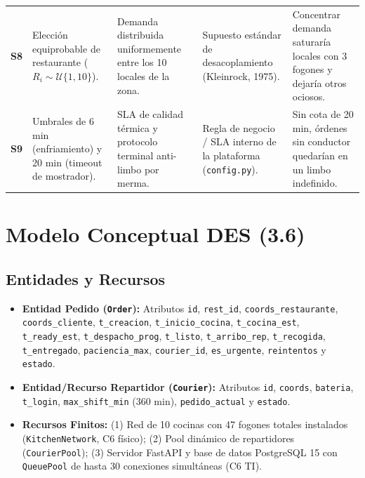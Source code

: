 \documentclass[11pt,letterpaper]{article}
\begin{document}
\begin{table}[htbp]
\begin{tabularx}{\textwidth}{c p{3.8cm} p{3.5cm} p{3.5cm} X}
\addlinespace
\textbf{S8} & Elección equiprobable de restaurante ($R_i \sim \mathcal{U}\{1, 10\}$). & Demanda distribuida uniformemente entre los 10 locales de la zona. & Supuesto estándar de desacoplamiento (Kleinrock, 1975). & Concentrar demanda saturaría locales con 3 fogones y dejaría otros ociosos. \\
\addlinespace
\textbf{S9} & Umbrales de 6 min (enfriamiento) y 20 min (timeout de mostrador). & SLA de calidad térmica y protocolo terminal anti-limbo por merma. & Regla de negocio / SLA interno de la plataforma (\texttt{config.py}). & Sin cota de 20 min, órdenes sin conductor quedarían en un limbo indefinido. \\
\bottomrule
\end{tabularx}
\end{table}

\section{Modelo Conceptual DES (3.6)}

\subsection{Entidades y Recursos}
\begin{itemize}[leftmargin=1.5em, itemsep=0.2em]
    \item \textbf{Entidad Pedido (\texttt{Order}):} Atributos \texttt{id}, \texttt{rest\_id}, \texttt{coords\_restaurante}, \texttt{coords\_cliente}, \texttt{t\_creacion}, \texttt{t\_inicio\_cocina}, \texttt{t\_cocina\_est}, \texttt{t\_ready\_est}, \texttt{t\_despacho\_prog}, \texttt{t\_listo}, \texttt{t\_arribo\_rep}, \texttt{t\_recogida}, \texttt{t\_entregado}, \texttt{paciencia\_max}, \texttt{courier\_id}, \texttt{es\_urgente}, \texttt{reintentos} y \texttt{estado}.
    \item \textbf{Entidad/Recurso Repartidor (\texttt{Courier}):} Atributos \texttt{id}, \texttt{coords}, \texttt{bateria}, \texttt{t\_login}, \texttt{max\_shift\_min} (360 min), \texttt{pedido\_actual} y \texttt{estado}.
    \item \textbf{Recursos Finitos:} (1) Red de 10 cocinas con 47 fogones totales instalados (\texttt{KitchenNetwork}, C6 físico); (2) Pool dinámico de repartidores (\texttt{CourierPool}); (3) Servidor FastAPI y base de datos PostgreSQL 15 con \texttt{QueuePool} de hasta 30 conexiones simultáneas (C6 TI).
\end{itemize}
\end{document}
